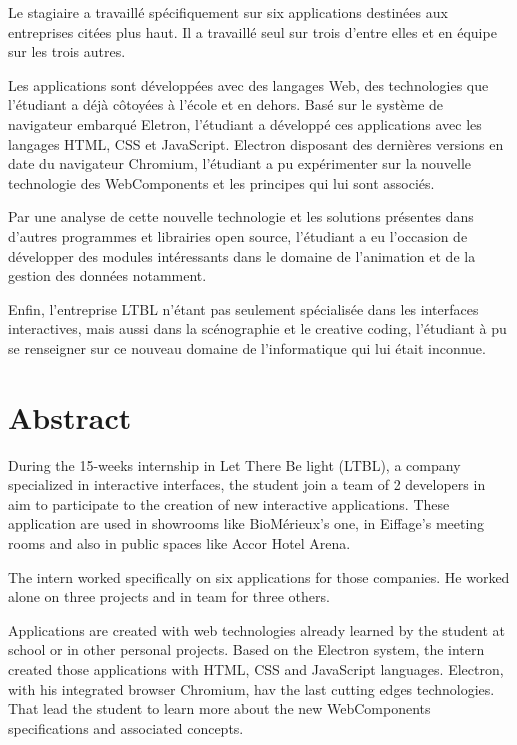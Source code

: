 \documentclass{article}
\begin{document}
    Le stagiaire a travaillé spécifiquement sur six applications destinées aux entreprises citées plus haut.
    Il a travaillé seul sur trois d'entre elles et en équipe sur les trois autres.

    Les applications sont développées avec des langages Web, des technologies que l'étudiant a déjà côtoyées à l'école et en dehors.
    Basé sur le système de navigateur embarqué Eletron, l'étudiant a développé ces applications avec les langages HTML, CSS et JavaScript.
    Electron disposant des dernières versions en date du navigateur Chromium, l'étudiant a pu expérimenter sur la nouvelle technologie des WebComponents et les principes qui lui sont associés.

    Par une analyse de cette nouvelle technologie et les solutions présentes dans d'autres programmes et librairies open source, l'étudiant a eu l'occasion de développer des modules intéressants dans le domaine de l'animation et de la gestion des données notamment.

    Enfin, l'entreprise LTBL n'étant pas seulement spécialisée dans les interfaces interactives, mais aussi dans la scénographie et le creative coding,
    l'étudiant à pu se renseigner sur ce nouveau domaine de l'informatique qui lui était inconnue.

    \section{Abstract}

    During the 15-weeks internship in Let There Be light (LTBL), a company specialized in interactive interfaces, the student join a team of 2 developers in aim to participate to the creation of new interactive applications.
    These application are used in showrooms like BioMérieux's one, in Eiffage's meeting rooms and also in public spaces like Accor Hotel Arena.

    The intern worked specifically on six applications for those companies.
    He worked alone on three projects and in team for three others.

    Applications are created with web technologies already learned by the student at school or in other personal projects.
    Based on the Electron system, the intern created those applications with HTML, CSS and JavaScript languages.
    Electron, with his integrated browser Chromium, hav the last cutting edges technologies.
    That lead the student to learn more about the new WebComponents specifications and associated concepts.
\end{document}
